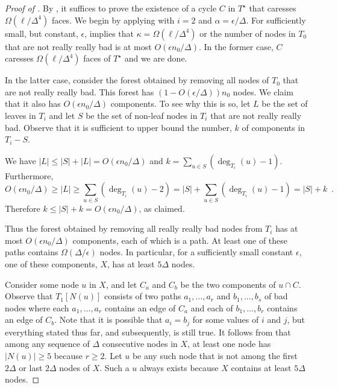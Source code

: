 \documentclass{patmorin}
\newcommand{\dual}[1]{{#1}^\star}
\begin{document}
\begin{proof}[Proof of ]
By , it suffices to prove the existence of
a cycle $C$ in $\dual{T}$ that caresses $\Omega(\ell/\Delta^4)$
faces.  We begin by applying  with
$i=2$ and $\alpha = \epsilon/\Delta$.  For sufficiently small, but constant,
$\epsilon$,  implies that $\kappa =
\Omega(\ell/\Delta^4)$ or the number of nodes in $T_0$ that are not really
really bad is at most $O(\epsilon n_0/\Delta)$.  In the former case,
$C$ caresses $\Omega(\ell/\Delta^4)$ faces of $\dual{T}$ and we are done.

In the latter case, consider the forest obtained by removing all
nodes of $T_0$ that are not really really bad.  This forest has
$(1-O(\epsilon/\Delta))n_0$ nodes.  We claim that it also has 
$O(\epsilon n_0/\Delta)$
components.  To see why this is so, let $L$ be the set of leaves in $T_i$
and let $S$ be the set of non-leaf nodes in $T_i$ that are not really
really bad.  Observe that it is sufficient to upper bound the number, 
$k$ of components in $T_i-S$.

We have
$|L|\le |S|+|L|=  O(\epsilon n_0/\Delta)$ and
$k=\sum_{u\in S}(\deg_{T_i}(u)-1)$.
Furthermore,
\[
    O(\epsilon n_0/\Delta) \ge |L| \ge \sum_{u\in S}(\deg_{T_i}(u)-2)
     = |S| + \sum_{u\in S}(\deg_{T_i}(u)-1) = |S| + k \enspace .
\]
Therefore $k\le |S|+k =  O(\epsilon n_0/\Delta)$, as claimed. 

Thus the forest obtained by removing all really really bad nodes from
$T_i$ has at most $O(\epsilon n_0/\Delta)$ components, each of which is
a path.  At least one of these paths contains $\Omega(\Delta/\epsilon)$
nodes. In particular, for a sufficiently small constant $\epsilon$,
one of these components, $X$, has at least $5\Delta$ nodes.


Consider some node $u$ in $X$, and let $C_a$ and $C_b$ be the
two components of $u\cap C$. Observe that $T_1[N(u)]$ consists
of two paths $a_1,\ldots,a_r$ and $b_1,\ldots,b_s$ of bad nodes
where each $a_1,\ldots,a_r$ contains an edge of $C_a$ and each of
$b_1,\ldots,b_r$ contains an edge of $C_b$. Note that it is
possible that $a_i=b_j$ for some values of $i$ and $j$, but everything
stated thus far, and subsequently, is still true. It follows from
 that among any sequence of $\Delta$
consecutive nodes in $X$, at least one node has $|N(u)|\ge 5$ because
$r\ge 2$.  Let $u$ be any such node that is not among the first $2\Delta$
or last $2\Delta$ nodes of $X$.  Such a $u$ always exists because $X$
contains at least $5\Delta$ nodes.


\end{proof}
\end{document}
